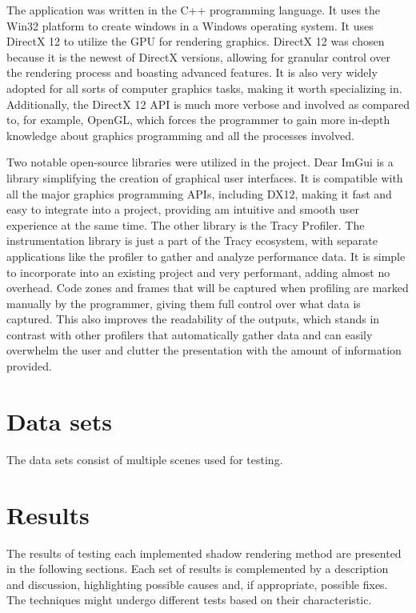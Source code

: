 The application was written in the C++ programming language. It uses the Win32 platform to create windows in a Windows operating system. It uses DirectX 12 to utilize the GPU for rendering graphics. DirectX 12 was chosen because it is the newest of DirectX versions, allowing for granular control over the rendering process and boasting advanced features. It is also very widely adopted for all sorts of computer graphics tasks, making it worth specializing in. Additionally, the DirectX 12 API is much more verbose and involved as compared to, for example, OpenGL, which forces the programmer to gain more in-depth knowledge about graphics programming and all the processes involved.

Two notable open-source libraries were utilized in the project. Dear ImGui is a library simplifying the creation of graphical user interfaces. It is compatible with all the major graphics programming APIs, including DX12, making it fast and easy to integrate into a project, providing am intuitive and smooth user experience at the same time. The other library is the Tracy Profiler. The instrumentation library is just a part of the Tracy ecosystem, with separate applications like the profiler to gather and analyze performance data. It is simple to incorporate into an existing project and very performant, adding almost no overhead. Code zones and frames that will be captured when profiling are marked manually by the programmer, giving them full control over what data is captured. This also improves the readability of the outputs, which stands in contrast with other profilers that automatically gather data and can easily overwhelm the user and clutter the presentation with the amount of information provided.

\section{Data sets}
The data sets consist of multiple scenes used for testing.

\section{Results}

The results of testing each implemented shadow rendering method are presented in the following sections. Each set of results is complemented by a description and discussion, highlighting possible causes and, if appropriate, possible fixes. The techniques might undergo different tests based on their characteristic.

